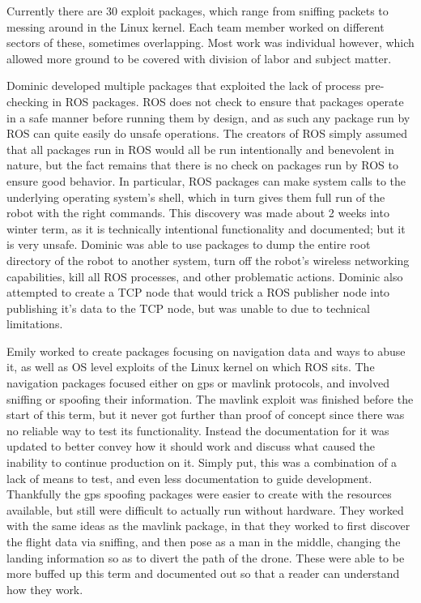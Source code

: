 \documentclass[IEEEtran,letterpaper,10pt,notitlepage,draftclsnofoot,onecolumn]{article}
\begin{document}
Currently there are 30 exploit packages, which range from sniffing packets to messing around in the Linux kernel.
Each team member worked on different sectors of these, sometimes overlapping.
Most work was individual however, which allowed more ground to be covered with division of labor and subject matter.

Dominic developed multiple packages that exploited the lack of process pre-checking
in ROS packages. ROS does not check to ensure that packages operate in a safe manner before running
them by design, and as such any package run by ROS can quite easily do unsafe operations. The creators of 
ROS simply assumed that all packages run in ROS would all be run intentionally and benevolent in nature,
but the fact remains that there is no check on packages run by ROS to ensure good behavior. In particular,
ROS packages can make system calls to the underlying operating system's shell, which in turn gives them full 
run of the robot with the right commands. This discovery was made about 2 weeks into winter term, as it is
technically intentional functionality and documented; but it is very unsafe. Dominic was able to use packages
to dump the entire root directory of the robot to another system, turn off the robot's wireless networking 
capabilities, kill all ROS processes, and other problematic actions. Dominic also attempted to create a TCP node
that would trick a ROS publisher node into publishing it's data to the TCP node, but was unable to due to 
technical limitations.

Emily worked to create packages focusing on navigation data and ways to abuse it, as well as OS level exploits of the Linux kernel on which ROS sits.
The navigation packages focused either on gps or mavlink protocols, and involved sniffing or spoofing their information.
The mavlink exploit was finished before the start of this term, but it never got further than proof of concept since there was no reliable way to test its functionality.
Instead the documentation for it was updated to better convey how it should work and discuss what caused the inability to continue production on it. 
Simply put, this was a combination of a lack of means to test, and even less documentation to guide development.
Thankfully the gps spoofing packages were easier to create with the resources available, but still were difficult to actually run without hardware.
They worked with the same ideas as the mavlink package, in that they worked to first discover the flight data via sniffing, and then pose as a man in the middle, changing the landing information so as to divert the path of the drone.
These were able to be more buffed up this term and documented out so that a reader can understand how they work.
\end{document}
